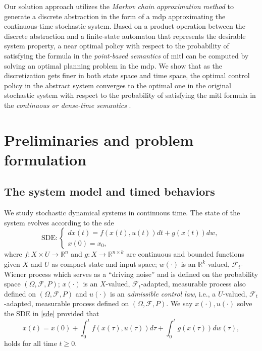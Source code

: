 \documentclass[letterpaper, 10 pt, conference]{ieeeconf}
\newcommand{\bbR}{\mathbb{R}}
\newcommand{\calF}{\mathcal{F}}
\begin{document}
Our solution approach utilizes the \emph{Markov chain approximation
  method} \cite{kushner2001numerical} to generate a discrete
abstraction in the form of a \ac{mdp} approximating the
continuous-time stochastic system. Based on a product operation
between the discrete abstraction and a finite-state automaton that
represents the desirable system property, a near optimal policy with
respect to the probability of satisfying the formula in the
\emph{point-based semantics} of \ac{mitl} \cite{henzinger1991temporal}
can be computed by solving an optimal planning problem in the
\ac{mdp}. We show that as the discretization gets finer in both state
space and time space, the optimal control policy in the abstract
system converges to the optimal one in the original stochastic system
with respect to the probability of satisfying the \ac{mitl} formula in
the \emph{continuous or dense-time semantics} \cite{Alur1996}.













\section{Preliminaries and problem formulation}
\label{sec:prelim}



\subsection{The system model and timed behaviors}


We study stochastic dynamical systems in continuous time.
The state of the system evolves according to the \ac{sde}
\begin{equation}
\label{sde}\text{SDE}:
\left\{ 
\begin{array}{l}
  dx(t)= f(x(t),u(t))dt + g(x(t))dw,\\
  x(0)=x_0,
\end{array}\right.
\end{equation}
where $f: X\times U \rightarrow \bbR^n$ and
$g: X \rightarrow \bbR^{n\times k}$ are continuous and bounded
functions given $X$ and $U$ as compact state and input
space; $w(\cdot)$ is an $\mathbb{R}^k$-valued, $\calF_t$-Wiener
process which serves as a ``driving noise'' and is defined on the
probability space $(\Omega, \calF, P)$; $x(\cdot)$ is an $X$-valued,
$\calF_t$-adapted, measurable process also defined on
$(\Omega, \calF, P)$ and $u(\cdot) $ is an \emph{admissible control
  law}, i.e., a $U$-valued, $\calF_t$-adapted, measurable process
defined on $(\Omega, \calF, P)$. We say $x(\cdot), u(\cdot)$ solve the SDE in \eqref{sde} provided that
\begin{equation}
  \label{integral}x(t)=x(0)+\int_0^t f(x(\tau), u(\tau))d\tau+ \int_0^t g(x(\tau))dw(\tau),
\end{equation}
holds for all time $t\ge 0$.
\end{document}
